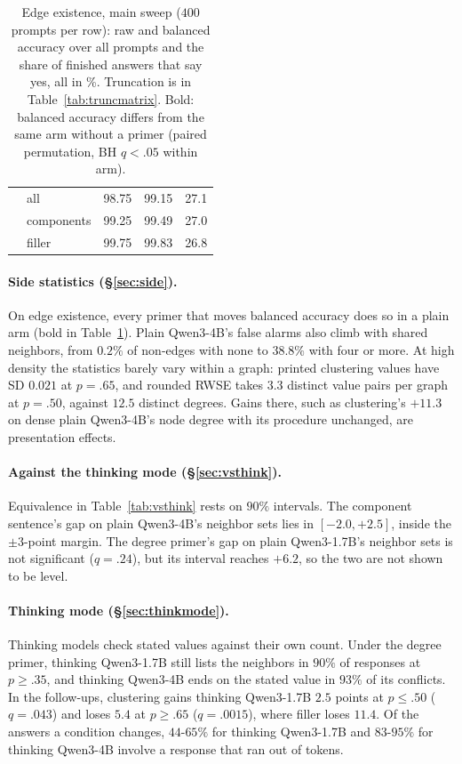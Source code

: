 \documentclass[11pt]{article}
\begin{document}
\begin{table}[!t]
\begin{tabular}{llrrr}
 & all & 98.75 & 99.15 & 27.1\\ %
 & components & 99.25 & 99.49 & 27.0\\ %
 & filler & 99.75 & 99.83 & 26.8\\ %
\bottomrule
\end{tabular}
\caption{Edge existence, main sweep ($400$ prompts per row): raw and balanced accuracy over all prompts and the share of finished answers that say yes, all in \%. Truncation is in Table~\ref{tab:truncmatrix}. Bold: balanced accuracy differs from the same arm without a primer (paired permutation, BH $q<.05$ within arm).} %
\label{tab:ee}
\end{table}





\paragraph{Side statistics (\S\ref{sec:side}).} On edge existence, every primer that moves balanced accuracy does so in a plain arm (bold in Table~\ref{tab:ee}). Plain Qwen3-4B's false alarms also climb with shared neighbors, from $0.2\%$ of non-edges with none to $38.8\%$ with four or more. %
At high density the statistics barely vary within a graph: printed clustering values have SD $0.021$ at $p=.65$, and rounded RWSE takes $3.3$ distinct value pairs per graph at $p=.50$, against $12.5$ distinct degrees. Gains there, such as clustering's $+11.3$ on dense plain Qwen3-4B's node degree with its procedure unchanged, are presentation effects. %

\paragraph{Against the thinking mode (\S\ref{sec:vsthink}).} Equivalence in Table~\ref{tab:vsthink} rests on $90\%$ intervals. The component sentence's gap on plain Qwen3-4B's neighbor sets lies in $[-2.0,+2.5]$, inside the $\pm3$-point margin. The degree primer's gap on plain Qwen3-1.7B's neighbor sets is not significant ($q=.24$), but its interval reaches $+6.2$, so the two are not shown to be level. %

\paragraph{Thinking mode (\S\ref{sec:thinkmode}).} Thinking models check stated values against their own count. Under the degree primer, thinking Qwen3-1.7B still lists the neighbors in $90\%$ of responses at $p\geq.35$, and thinking Qwen3-4B ends on the stated value in $93\%$ of its conflicts. %
In the follow-ups, clustering gains thinking Qwen3-1.7B $2.5$ points at $p\leq.50$ ($q=.043$) and loses $5.4$ at $p\geq.65$ ($q=.0015$), where filler loses $11.4$. %
Of the answers a condition changes, $44$-$65\%$ for thinking Qwen3-1.7B and $83$-$95\%$ for thinking Qwen3-4B involve a response that ran out of tokens. %
\end{document}

